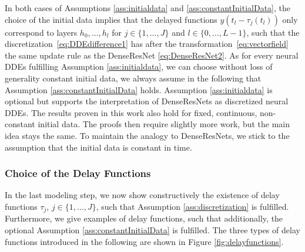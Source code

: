 \documentclass[10pt]{article}
\numberwithin{equation}{section}
\begin{document}
	In both cases of Assumptions  \ref{ass:initialdata} and \ref{ass:constantInitialData}, the choice of the initial data implies that the delayed functions $y(t_l-\tau_j(t_l))$ only correspond to layers $h_0,\ldots,h_l$ for $j \in \{1,\ldots,J\}$ and $ l \in \{0,\ldots,L-1\}$, such that the discretization~\eqref{eq:DDEdifference1} has after the transformation~\eqref{eq:vectorfield} the same update rule as the DenseResNet \eqref{eq:DenseResNet2}. As for every neural DDEs fulfilling Assumption \ref{ass:initialdata}, we can choose without loss of generality constant initial data, we always assume in the following that Assumption \ref{ass:constantInitialData} holds. Assumption \ref{ass:initialdata} is optional but supports the interpretation of DenseResNets as discretized neural DDEs. The results proven in this work also hold for fixed, continuous, non-constant initial data. The proofs then require slightly more work, but the main idea stays the same. To maintain the analogy to DenseResNets, we stick to the assumption that the initial data is constant in time.  
	
	
	\subsubsection*{Choice of the Delay Functions}
	
	In the last modeling step, we now show constructively the existence of delay functions $\tau_j$, $j\in \{1,\ldots,J\}$, such that Assumption \ref{ass:discretization} is fulfilled. Furthermore, we give examples of delay functions, such that additionally, the optional Assumption \ref{ass:constantInitialData} is fulfilled. The three types of delay functions introduced in the following are shown in Figure \ref{fig:delayfunctions}.
	
\end{document}
